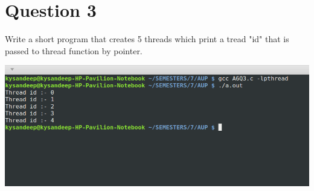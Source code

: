\documentclass[main.tex]{subfiles}
\begin{document}
\section{Question 3}
Write a short program that creates 5 threads which print a tread "id" that is
passed to thread function by pointer.


\includegraphics[width=\textwidth]{figures/3_output.png}
\end{document}
